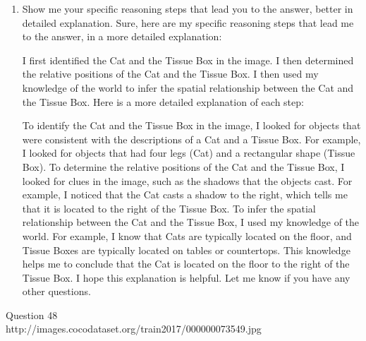 \begin{enumerate}
    Here are some additional details about the spatial relationship between the Cat and the Tissue Box:
    
    The Cat is a small, furry animal that is known for its agility and curiosity.
    The Tissue Box is a small, rectangular container that is used to hold tissues.
    The Cat is located on the floor, which is a horizontal surface that is typically covered in carpeting.
    The Tissue Box is located on the floor, which is a horizontal surface that is typically covered in carpeting.
    I hope this description is helpful. Let me know if you have any other questions.
    \item Show me your specific reasoning steps that lead you to the answer, better in detailed explanation.
    \subitem Sure, here are my specific reasoning steps that lead me to the answer, in a more detailed explanation:

    I first identified the Cat and the Tissue Box in the image.
    I then determined the relative positions of the Cat and the Tissue Box.
    I then used my knowledge of the world to infer the spatial relationship between the Cat and the Tissue Box.
    Here is a more detailed explanation of each step:
    
    To identify the Cat and the Tissue Box in the image, I looked for objects that were consistent with the descriptions of a Cat and a Tissue Box. For example, I looked for objects that had four legs (Cat) and a rectangular shape (Tissue Box).
    To determine the relative positions of the Cat and the Tissue Box, I looked for clues in the image, such as the shadows that the objects cast. For example, I noticed that the Cat casts a shadow to the right, which tells me that it is located to the right of the Tissue Box.
    To infer the spatial relationship between the Cat and the Tissue Box, I used my knowledge of the world. For example, I know that Cats are typically located on the floor, and Tissue Boxes are typically located on tables or countertops. This knowledge helps me to conclude that the Cat is located on the floor to the right of the Tissue Box.
    I hope this explanation is helpful. Let me know if you have any other questions.
\end{enumerate}
Question 48\\
http://images.cocodataset.org/train2017/000000073549.jpg

